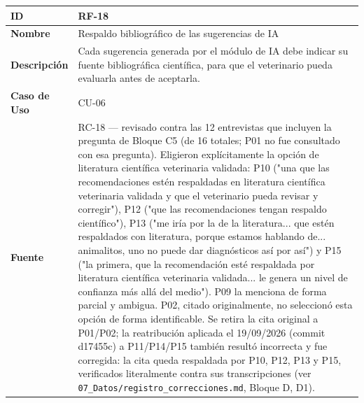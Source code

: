 \documentclass[
]{article}
\newcounter{none} %
\begin{document}
{\def\LTcaptype{none} %
\begin{longtable}[]{|
  >{\raggedright\arraybackslash}p{}|
  >{\raggedright\arraybackslash}p{}|}
\hline
\begin{minipage}[b]{\linewidth}\raggedright
\textbf{ID}
\end{minipage} & \begin{minipage}[b]{\linewidth}\raggedright
RF-18
\end{minipage} \\
\hline
\endhead
\hline
\endlastfoot
\textbf{Nombre} & \begin{minipage}[t]{\linewidth}\raggedright
Respaldo bibliográfico de las sugerencias de IA
\end{minipage} \\
\hline
\textbf{Descripción} & \begin{minipage}[t]{\linewidth}\raggedright
Cada sugerencia generada por el módulo de IA debe indicar su fuente bibliográfica científica, para que el veterinario pueda evaluarla antes de aceptarla.
\end{minipage} \\
\hline
\textbf{Caso de Uso} & \begin{minipage}[t]{\linewidth}\raggedright
CU-06
\end{minipage} \\
\hline
\textbf{Fuente} & \begin{minipage}[t]{\linewidth}\raggedright
RC-18 — revisado contra las 12 entrevistas que incluyen la pregunta de Bloque C5 (de 16 totales; P01 no fue consultado con esa pregunta). Eligieron explícitamente la opción de literatura científica veterinaria validada: P10 ("una que las recomendaciones estén respaldadas en literatura científica veterinaria validada y que el veterinario pueda revisar y corregir"), P12 ("que las recomendaciones tengan respaldo científico"), P13 ("me iría por la de la literatura... que estén respaldados con literatura, porque estamos hablando de... animalitos, uno no puede dar diagnósticos así por así") y P15 ("la primera, que la recomendación esté respaldada por literatura científica veterinaria validada... le genera un nivel de confianza más allá del medio"). P09 la menciona de forma parcial y ambigua. P02, citado originalmente, no seleccionó esta opción de forma identificable. Se retira la cita original a P01/P02; la reatribución aplicada el 19/09/2026 (commit d17455c) a P11/P14/P15 también resultó incorrecta y fue corregida: la cita queda respaldada por P10, P12, P13 y P15, verificados literalmente contra sus transcripciones (ver \texttt{07\_Datos/registro\_correcciones.md}, Bloque D, D1).

\end{minipage}
\end{longtable}}
\end{document}
